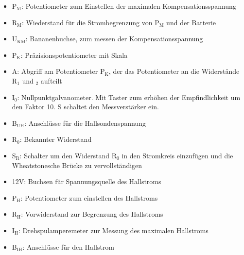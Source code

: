 \documentclass[12pt]{scrartcl}
\begin{document}
\begin{enumerate}
\begin{itemize}
\item
P$_\text{M}$: Potentiometer zum Einstellen der maximalen Kompensationsspannung

\item
R$_\text{M}$: Wiederstand für die Strombegrenzung von P$_\text{M}$ und der Batterie

\item
U$_\text{KM}$: Bananenbuchse, zum messen der Kompensationsspannung

\item
P$_\text{K}$: Präzisionspotentiometer mit Skala

\item
A: Abgriff am Potentiometer P$_\text{K}$, der das Potentiometer an die Widerstände R$_\text{1}$ und $_\text{2}$ aufteilt

\item
I$_\text{0}$: Nullpunktgalvanometer. Mit Taster zum erhöhen der Empfindlichkeit um den Faktor 10. S schaltet den Messverstärker ein.

\item
B$_\text{UH}$: Anschlüsse für die Hallsondenspannung

\item
R$_\text{0}$: Bekannter Widerstand

\item
S$_\text{R}$: Schalter um den Widerstand R$_\text{0}$ in den Stromkreis einzufügen und die Wheatstonesche Brücke zu vervollständigen

\item
12V: Buchsen für Spannungsquelle des Hallstroms

\item
P$_\text{H}$: Potentiometer zum einstellen des Hallstroms

\item
R$_\text{H}$: Vorwiderstand zur Begrenzung des Hallstroms

\item
I$_\text{H}$: Drehspulamperemeter zur Messung des maximalen Hallstroms

\item
B$_\text{IH}$: Anschlüsse für den Hallstrom

\end{itemize}


\end{enumerate}
\end{document}

